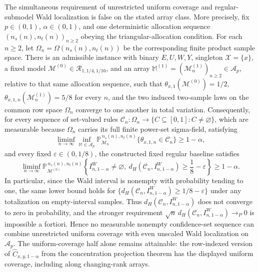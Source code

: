 The simultaneous requirement of unrestricted uniform coverage and regular-submodel Wald localization is false on the stated array class. More precisely, fix \(p\in(0,1)\), \(\alpha\in(0,1)\), and one deterministic allocation sequence \((n_s(n),n_t(n))_{n\ge2}\) obeying the triangular-allocation condition. For each \(n\ge2\), let \(\Omega_n=\Omega(n_s(n),n_t(n))\) be the corresponding finite product sample space. There is an admissible instance with binary \(E,U,W,Y\), singleton \(\mathcal X=\{x\}\), a fixed model \(\mathcal M^{(0)}\in\mathcal R_{1,1/4,1/16}\), and an array \(\mathbb M^{(1)}=(\mathcal M^{(1)}_n)_{n\ge2}\in\mathcal A_p\), relative to that same allocation sequence, such that \(\theta_{x,1}(\mathcal M^{(0)})=1/2\), \(\theta_{x,1,n}(\mathcal M^{(1)}_n)=5/8\) for every \(n\), and the two induced two-sample laws on the common row space \(\Omega_n\) converge to one another in total variation. Consequently, for every sequence of set-valued rules \(\mathcal C_n:\Omega_n\to\{C\subseteq[0,1]:C\ne\varnothing\}\), which are measurable because \(\Omega_n\) carries its full finite power-set sigma-field, satisfying
\[
\liminf_{n\to\infty}\inf_{\mathbb M\in\mathcal A_p}
\mathbb P_{\mathcal M_n}^{\,n_s(n),n_t(n)}
\{\theta_{x,1,n}\in\mathcal C_n\}
\ge 1-\alpha,
\]
and every fixed \(\varepsilon\in(0,1/8)\), the constructed fixed regular baseline satisfies
\[
\liminf_{n\to\infty}
\mathbb P_{\mathcal M^{(0)}}^{\,n_s(n),n_t(n)}
\left\{I^W_{n,1-\alpha}\ne\varnothing,\ 
d_H\!\left(\mathcal C_n,I^W_{n,1-\alpha}\right)
\ge\frac18-\varepsilon\right\}
\ge1-\alpha.
\]
In particular, since the Wald interval is nonempty with probability tending to one, the same lower bound holds for \(\{d_H(\mathcal C_n,I^W_{n,1-\alpha})\ge1/8-\varepsilon\}\) under any totalization on empty-interval samples. Thus \(d_H(\mathcal C_n,I^W_{n,1-\alpha})\) does not converge to zero in probability, and the stronger requirement \(\sqrt n\,d_H(\mathcal C_n,I^W_{n,1-\alpha})\longrightarrow_P0\) is impossible a fortiori. Hence no measurable nonempty confidence-set sequence can combine unrestricted uniform coverage with even unscaled Wald localization on \(\mathcal A_p\). The uniform-coverage half alone remains attainable: the row-indexed version of \(\widehat C_{x,y,1-\alpha}\) from the concentration projection theorem has the displayed uniform coverage, including along changing-rank arrays.